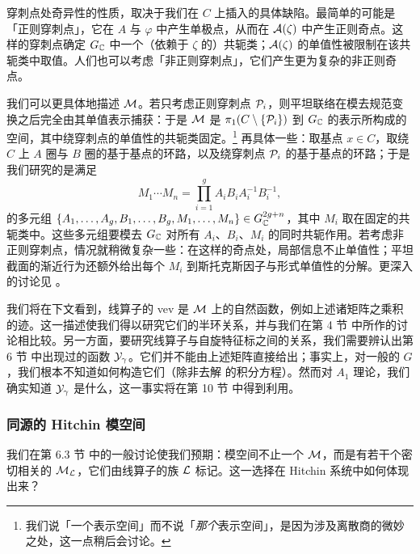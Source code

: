 穿刺点处奇异性的性质，取决于我们在 $C$ 上插入的具体缺陷。最简单的可能是「正则穿刺点」，它在 $A$ 与 $\varphi$ 中产生单极点，从而在 $\mathcal{A}(\zeta)$ 中产生正则奇点。这样的穿刺点确定 $G_{\mathbb{C}}$ 中一个（依赖于 $\zeta$ 的）共轭类；$\mathcal{A}(\zeta)$ 的单值性被限制在该共轭类中取值。人们也可以考虑「非正则穿刺点」，它们产生更为复杂的非正则奇点。

我们可以更具体地描述 $\mathcal{M}$。若只考虑正则穿刺点 $\mathcal{P}_i$，则平坦联络在模去规范变换之后完全由其单值表示捕获：于是 $\mathcal{M}$ 是 $\pi_1(C\setminus\{\mathcal{P}_i\})$ 到 $G_{\mathbb{C}}$ 的表示所构成的空间，其中绕穿刺点的单值性的共轭类固定。\footnote{我们说「一个表示空间」而不说「\emph{那个}表示空间」，是因为涉及离散商的微妙之处，这一点稍后会讨论。} 再具体一些：取基点 $x\in C$，取绕 $C$ 上 $A$ 圈与 $B$ 圈的基于基点的环路，以及绕穿刺点 $\mathcal{P}_i$ 的基于基点的环路；于是我们研究的是满足
\begin{equation}
M_1 \cdots M_n = \prod_{i=1}^{g} A_i B_i A_i^{-1} B_i^{-1},
\end{equation}
的多元组 $\{A_1,\dots,A_g,B_1,\dots,B_g,M_1,\dots,M_n\}\in G_{\mathbb{C}}^{2g+n}$，其中 $M_i$ 取在固定的共轭类中。这些多元组要模去 $G_{\mathbb{C}}$ 对所有 $A_i$、$B_i$、$M_i$ 的同时共轭作用。若考虑非正则穿刺点，情况就稍微复杂一些：在这样的奇点处，局部信息不止单值性；平坦截面的渐近行为还额外给出每个 $M_i$ 到斯托克斯因子与形式单值性的分解。更深入的讨论见 \cite{Witten:2007td}。

我们将在下文看到，线算子的 vev 是 $\mathcal{M}$ 上的自然函数，例如上述诸矩阵之乘积的迹。这一描述使我们得以研究它们的半环关系，并与我们在第 4 节%
中所作的讨论相比较。另一方面，要研究线算子与自旋特征标之间的关系，我们需要辨认出第 6 节%
中出现过的函数 $\mathcal{Y}_\gamma$。它们并不能由上述矩阵直接给出；事实上，对一般的 $G$，我们根本不知道如何构造它们（除非去解 \cite{Gaiotto:2008cd} 的积分方程）。然而对 $A_1$ 理论，我们确实知道 $\mathcal{Y}_\gamma$ 是什么\cite{Gaiotto:2009hg}，这一事实将在第 10 节%
中得到利用。

\subsubsection{同源的 Hitchin 模空间}\label{subsec:Hitchin-Isogenous}

我们在第 6.3 节%
中的一般讨论使我们预期：模空间不止一个 $\mathcal{M}$，而是有若干个密切相关的 $\mathcal{M}_{\mathcal{L}}$，它们由线算子的族 $\mathcal{L}$ 标记。这一选择在 Hitchin 系统中如何体现出来？

